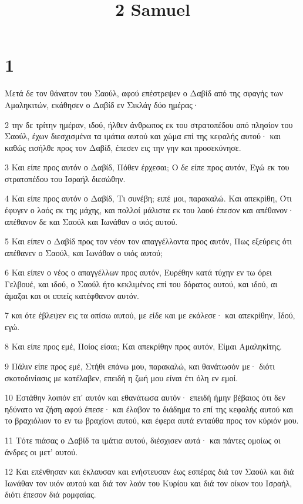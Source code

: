 

\title{2 Samuel}


\chapter{1}

\par Μετά δε τον θάνατον του Σαούλ, αφού επέστρεψεν ο Δαβίδ από της σφαγής των Αμαληκιτών, εκάθησεν ο Δαβίδ εν Σικλάγ δύο ημέρας·
\par 2 την δε τρίτην ημέραν, ιδού, ήλθεν άνθρωπος εκ του στρατοπέδου από πλησίον του Σαούλ, έχων διεσχισμένα τα ιμάτια αυτού και χώμα επί της κεφαλής αυτού· και καθώς εισήλθε προς τον Δαβίδ, έπεσεν εις την γην και προσεκύνησε.
\par 3 Και είπε προς αυτόν ο Δαβίδ, Πόθεν έρχεσαι; Ο δε είπε προς αυτόν, Εγώ εκ του στρατοπέδου του Ισραήλ διεσώθην.
\par 4 Και είπε προς αυτόν ο Δαβίδ, Τι συνέβη; ειπέ μοι, παρακαλώ. Και απεκρίθη, Ότι έφυγεν ο λαός εκ της μάχης, και πολλοί μάλιστα εκ του λαού έπεσον και απέθανον· απέθανον δε και Σαούλ και Ιωνάθαν ο υιός αυτού.
\par 5 Και είπεν ο Δαβίδ προς τον νέον τον απαγγέλλοντα προς αυτόν, Πως εξεύρεις ότι απέθανεν ο Σαούλ, και Ιωνάθαν ο υιός αυτού;
\par 6 Και είπεν ο νέος ο απαγγέλλων προς αυτόν, Ευρέθην κατά τύχην εν τω όρει Γελβουέ, και ιδού, ο Σαούλ ήτο κεκλιμένος επί του δόρατος αυτού, και ιδού, αι άμαξαι και οι ιππείς κατέφθανον αυτόν.
\par 7 και ότε έβλεψεν εις τα οπίσω αυτού, με είδε και με εκάλεσε· και απεκρίθην, Ιδού, εγώ.
\par 8 Και είπε προς εμέ, Ποίος είσαι; Και απεκρίθην προς αυτόν, Είμαι Αμαληκίτης.
\par 9 Πάλιν είπε προς εμέ, Στήθι επάνω μου, παρακαλώ, και θανάτωσόν με· διότι σκοτοδινίασις με κατέλαβεν, επειδή η ζωή μου είναι έτι όλη εν εμοί.
\par 10 Εστάθην λοιπόν επ' αυτόν και εθανάτωσα αυτόν· επειδή ήμην βέβαιος ότι δεν ηδύνατο να ζήση αφού έπεσε· και έλαβον το διάδημα το επί της κεφαλής αυτού και το βραχιόλιον το εν τω βραχίονι αυτού, και έφερα αυτά ενταύθα προς τον κύριόν μου.
\par 11 Τότε πιάσας ο Δαβίδ τα ιμάτια αυτού, διέσχισεν αυτά· και πάντες ομοίως οι άνδρες οι μετ' αυτού.
\par 12 Και επένθησαν και έκλαυσαν και ενήστευσαν έως εσπέρας διά τον Σαούλ και διά Ιωνάθαν τον υιόν αυτού και διά τον λαόν του Κυρίου και διά τον οίκον του Ισραήλ, διότι έπεσον διά ρομφαίας.
